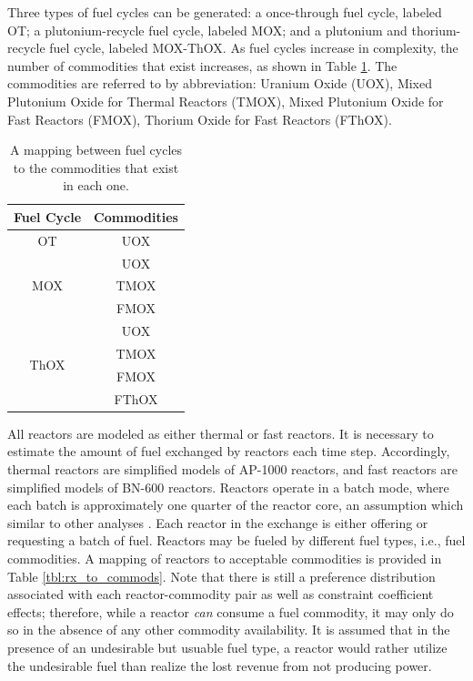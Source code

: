 \documentclass{anstrans}
\begin{document}
Three types of fuel cycles can be generated: a once-through fuel cycle, labeled
OT; a plutonium-recycle fuel cycle, labeled MOX; and a plutonium and
thorium-recycle fuel cycle, labeled MOX-ThOX. As fuel cycles increase in
complexity, the number of commodities that exist increases, as shown in Table
\ref{tbl:fc_to_commods}. The commodities are referred to by abbreviation:
Uranium Oxide (UOX), Mixed Plutonium Oxide for Thermal Reactors (TMOX), Mixed
Plutonium Oxide for Fast Reactors (FMOX), Thorium Oxide for Fast Reactors
(FThOX).

\begin{table}[]
\centering
\caption{A mapping between fuel cycles to the commodities that exist in each one.}
\label{tbl:fc_to_commods}
\begin{tabular}{|c|c|}
\hline
\textbf{Fuel Cycle}            & \textbf{Commodities} \\ \hline
OT                    & UOX         \\ \hline
\multirow{3}{*}{MOX}  & UOX         \\  
                      & TMOX        \\  
                      & FMOX        \\ \hline
\multirow{4}{*}{ThOX} & UOX         \\  
                      & TMOX        \\  
                      & FMOX        \\  
                      & FThOX       \\ \hline
\end{tabular}
\end{table}

All reactors are modeled as either thermal or fast reactors. It is necessary to
estimate the amount of fuel exchanged by reactors each time step. Accordingly,
thermal reactors are simplified models of AP-1000 reactors, and fast reactors
are simplified models of BN-600 reactors. Reactors operate in a batch mode,
where each batch is approximately one quarter of the reactor core, an assumption
which similar to other analyses \cite{rineiski2011reactivity}. Each reactor in
the exchange is either offering or requesting a batch of fuel. Reactors may be
fueled by different fuel types, i.e., fuel commodities. A mapping of reactors to
acceptable commodities is provided in Table \ref{tbl:rx_to_commods}. Note that
there is still a preference distribution associated with each reactor-commodity
pair as well as constraint coefficient effects; therefore, while a reactor
\textit{can} consume a fuel commodity, it may only do so in the absence of any
other commodity availability. It is assumed that in the presence of an
undesirable but usuable fuel type, a reactor would rather utilize the
undesirable fuel than realize the lost revenue from not producing power.
\end{document}
